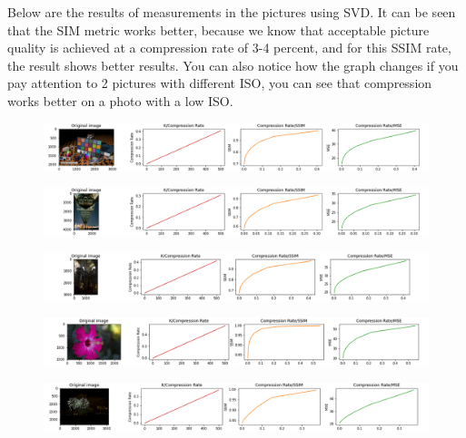 Below are the results of measurements in the pictures using SVD. It can be seen that the SIM metric works better, because we know that acceptable picture quality is achieved at a compression rate of 3-4 percent, and for this SSIM rate, the result shows better results. You can also notice how the graph changes if you pay attention to 2 pictures with different ISO, you can see that compression works better on a photo with a low ISO.

\begin{figure}[H]
  \centering
  \includegraphics[width=\linewidth]{articial.png}
  \label{fig:exmp_10}
\end{figure}

\begin{figure}[H]
  \centering
  \includegraphics[width=\linewidth]{Bridge.png}
  \label{fig:exmp_11}
\end{figure}

\begin{figure}[H]
  \centering
  \includegraphics[width=\linewidth]{Cathedral.png}
  \label{fig:exmp_12}
\end{figure}

\begin{figure}[H]
  \centering
  \includegraphics[width=\linewidth]{Flower Foveon.png}
  \label{fig:exmp_13}
\end{figure}

\begin{figure}[H]
  \centering
  \includegraphics[width=\linewidth]{Fireworks.png}
  \label{fig:exmp_14}
\end{figure}

